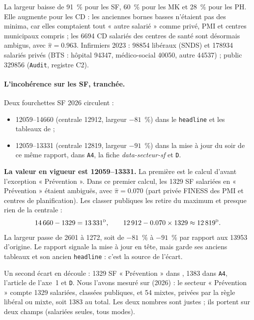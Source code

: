 La largeur baisse de 91~\%\derive{} pour les SF, 60~\%\derive{} pour les MK et 28~\%\derive{} pour les PH.
Elle augmente pour les CD : les anciennes bornes basses n'étaient pas des minima, car elles comptaient tout
« autre salarié » comme privé, PMI et centres municipaux compris ; les \num{6694}\mesure{} CD salariés des
centres de santé sont désormais ambigus, avec $\hat\pi = \num{0.963}$\mesure. Infirmiers 2023 : \num{98854}\mesure{}
libéraux (SNDS) et \num{178934}\mesure{} salariés privés (BTS : hôpital \num{94347}, médico-social \num{40050},
autre \num{44537}\mesure) ; public \num{329856}\mesure{} (\texttt{Audit}, registre C2).

\paragraph{L'incohérence sur les SF, tranchée.} Deux fourchettes SF 2026 circulent :
\begin{itemize}
  \item \num{12059}--\num{14660}\mesure{} (centrale \num{12912}, largeur $-81$~\%\derive) dans le
  \texttt{headline} et les tableaux de  ;
  \item \num{12059}--\num{13331}\mesure{} (centrale \num{12819}\derive, largeur $-91$~\%\derive) dans la mise à
  jour du soir de ce même rapport, dans \texttt{A4}, la fiche \emph{data-secteur-sf} et \texttt{D}.
\end{itemize}
\textbf{La valeur en vigueur est \num{12059}--\num{13331}.} La première est le calcul d'avant l'exception
« Prévention ». Dans ce premier calcul, les \num{1329}\mesure{} SF salariées en « Prévention » étaient ambiguës,
avec $\hat\pi = \num{0.070}$\mesure{} (part privée FINESS des PMI et centres de planification). Les classer
publiques les retire du maximum et presque rien de la centrale :
\[
\num{14660} - \num{1329} = \num{13331}\textsuperscript{\textsc{d}}, \qquad
\num{12912} - \num{0.070}\times\num{1329} \approx \num{12819}\textsuperscript{\textsc{d}} .
\]
La largeur passe de \num{2601}\derive{} à \num{1272}\derive{}, soit de $-81$~\% à $-91$~\%\derive{} par
rapport aux \num{13953}\derive{} d'origine. Le rapport signale la mise à jour en tête, mais garde ses anciens
tableaux et son ancien \texttt{headline} : c'est la source de l'écart.

Un second écart en découle : \num{1329}\mesure{} SF « Prévention » dans , \num{1383} dans \texttt{A4},
l'article de l'axe~1 et \texttt{D}. Nous l'avons mesuré sur  (2026) : le
secteur « Prévention » compte \num{1329}\mesure{} salariées, classées publiques, et \num{54}\mesure{} mixtes,
privées par la règle libéral ou mixte, soit \num{1383}\mesure{} au total. Les deux nombres sont justes ; ils
portent sur deux champs (salariées seules, tous modes).

